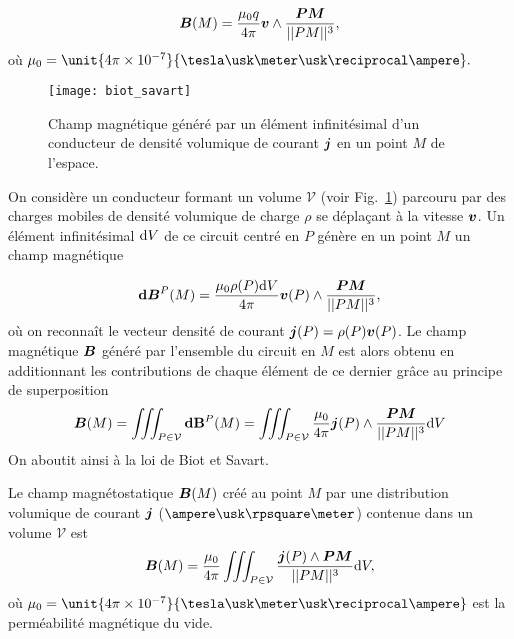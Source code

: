 \begin{equation*}
	\vecb(M) = \dfrac{\mu_0 q}{4 \pi} \vecv \wedge \dfrac{\mitbf{PM}}{||PM||^3},
\end{equation*}
où $\mu_0 = \unit{4 \pi \times 10^{-7}}{\tesla \usk \meter \usk \reciprocal 
\ampere}.$

\begin{figure}[h!]
	\centering
	\texttt{[image: biot\_savart]}
	\caption{Champ magnétique généré par un élément infinitésimal d'un conducteur
	de densité volumique de courant $\vecj$ en un point $M$ de l'espace.}%
	\label{fig:magneto_biot_savart}
\end{figure}

On considère un conducteur formant un volume $\mathcal{V}$ 
(voir Fig.~\ref{fig:magneto_biot_savart}) parcouru par des charges mobiles 
de densité volumique de charge $\rho$ se déplaçant à la vitesse $\vecv$. Un élément 
infinitésimal $\mathrm{d}V$ de ce circuit centré en $P$ génère en un point $M$ un champ magnétique

\begin{equation*}
	\mathrm{\textbf{d}}\mitbf{B}^P(M) = \dfrac{\mu_0 \rho(P) \dV}
	{4 \pi} \vecv(P) \wedge 
	          \dfrac{\mitbf{PM}}{||PM||^3},
\end{equation*}
où on reconnaît le vecteur densité de courant $\vecj(P) = \rho(P) \vecv(P)$. 
Le champ magnétique
$\vecb$ généré par l'ensemble du circuit en $M$ est alors obtenu en additionnant les 
contributions de chaque élément de ce dernier grâce au principe de superposition
\begin{equation*}
	\vecb(M) = \iiint_{P \in \mathcal{V}} \mathbf{d}\vec{B}^P(M)
		 = \iiint_{P \in \mathcal{V}} \dfrac{\mu_0}
		 {4 \pi} \vecj(P) \wedge 
          \dfrac{\mitbf{PM}}{||PM||^3} \dV
\end{equation*}
On aboutit ainsi à la loi de Biot et Savart.

\begin{defn}
	Le champ magnétostatique $\vecb(M)$ créé au point $M$ par une distribution
	volumique de courant $\vecj$ ($\ampere \usk \rpsquare \meter$) contenue
	dans un volume $\mathcal{V}$ est
	\begin{equation}
		\vecb(M) = \dfrac{\mu_0}{4 \pi} \iiint_{P \in \mathcal{V}} 
		\dfrac{\vecj(P) \wedge \mitbf{PM}}{||PM||^3} \dV,
	\end{equation}
	où $\mu_0 = \unit{4 \pi \times 10^{-7}}{\tesla \usk \meter \usk \reciprocal
	\ampere}$ est la perméabilité magnétique du vide.

\end{defn}


